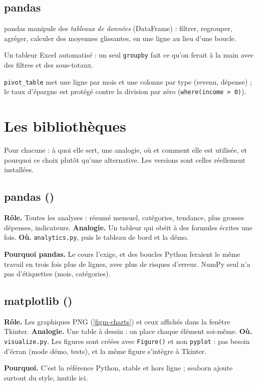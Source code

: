 \documentclass[11pt,a4paper]{article}
\newcommand{\code}[1]{{\NoAutoSpacing\texttt{#1}}}
\begin{document}
\subsection{pandas}
\begin{definition}
pandas manipule des \emph{tableaux de données} (DataFrame) : filtrer, regrouper, agréger,
calculer des moyennes glissantes, en une ligne au lieu d'une boucle.
\end{definition}
\begin{analogie}
Un tableur Excel automatisé : un seul \code{groupby} fait ce qu'on ferait à la main avec des
filtres et des sous-totaux.
\end{analogie}

\code{pivot\_table} met une ligne par mois et une colonne par type (revenu, dépense) ; le
taux d'épargne est protégé contre la division par zéro (\code{where(income > 0)}).

\section{Les bibliothèques}
Pour chacune : à quoi elle sert, une analogie, où et comment elle est utilisée, et pourquoi ce
choix plutôt qu'une alternative. Les versions sont celles réellement installées.

\subsection{pandas (\VerPandas)}
\textbf{Rôle.} Toutes les analyses : résumé mensuel, catégories, tendance, plus grosses
dépenses, indicateurs. \textbf{Analogie.} Un tableur qui obéit à des formules écrites une
fois. \textbf{Où.} \code{analytics.py}, puis le tableau de bord et la démo.

\textbf{Pourquoi pandas.} Le cours l'exige, et des boucles Python feraient le même travail en
trois fois plus de lignes, avec plus de risques d'erreur. NumPy seul n'a pas d'étiquettes
(mois, catégories).

\subsection{matplotlib (\VerMatplotlib)}
\textbf{Rôle.} Les graphiques PNG (\cref{figm-charts}) et ceux affichés dans la fenêtre
Tkinter. \textbf{Analogie.} Une table à dessin : on place chaque élément soi-même.
\textbf{Où.} \code{visualize.py}. Les figures sont créées avec \code{Figure()} et non
\code{pyplot} : pas besoin d'écran (mode démo, tests), et la même figure s'intègre à Tkinter.

\textbf{Pourquoi.} C'est la référence Python, stable et hors ligne ; seaborn ajoute surtout du
style, inutile ici.
\end{document}
